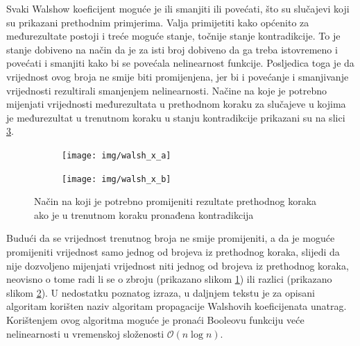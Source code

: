 Svaki Walshow koeficijent moguće je ili smanjiti ili povećati, što su slučajevi koji su prikazani prethodnim primjerima.
Valja primijetiti kako općenito za međurezultate postoji i treće moguće stanje, točnije stanje kontradikcije.
To je stanje dobiveno na način da je za isti broj dobiveno da ga treba istovremeno i povećati i smanjiti kako bi se povećala nelinearnost funkcije.
Posljedica toga je da vrijednost ovog broja ne smije biti promijenjena, jer bi i povećanje i smanjivanje vrijednosti rezultirali smanjenjem nelinearnosti.
Načine na koje je potrebno mijenjati vrijednosti međurezultata u prethodnom koraku za slučajeve u kojima je međurezultat u trenutnom koraku u stanju kontradikcije prikazani su na slici \ref{fig:walsh_x}.
\begin{figure}[th!]
    \centering
    \begin{subfigure}{.5\textwidth}
        \centering
        \texttt{[image: img/walsh\_x\_a]}
        \captionsetup{justification=centering}
        \caption{}
        \label{fig:walsh_x_a}
    \end{subfigure}%
    \begin{subfigure}{.5\textwidth}
        \centering
        \texttt{[image: img/walsh\_x\_b]}
        \captionsetup{justification=centering}
        \caption{}
        \label{fig:walsh_x_b}
    \end{subfigure}
    \caption{Način na koji je potrebno promijeniti rezultate prethodnog koraka ako je u trenutnom koraku pronađena kontradikcija}
    \label{fig:walsh_x}
\end{figure}
Budući da se vrijednost trenutnog broja ne smije promijeniti, a da je moguće promijeniti vrijednost samo jednog od brojeva iz prethodnog koraka, slijedi da nije dozvoljeno mijenjati vrijednost niti jednog od brojeva iz prethodnog koraka, neovisno o tome radi li se o zbroju (prikazano slikom \ref{fig:walsh_x_a}) ili razlici (prikazano slikom \ref{fig:walsh_x_b}).
U nedostatku poznatog izraza, u daljnjem tekstu je za opisani algoritam korišten naziv algoritam propagacije Walshovih koeficijenata unatrag.
Korištenjem ovog algoritma moguće je pronaći Booleovu funkciju veće nelinearnosti u vremenskoj složenosti $\mathcal{O}(n\log n)$.

